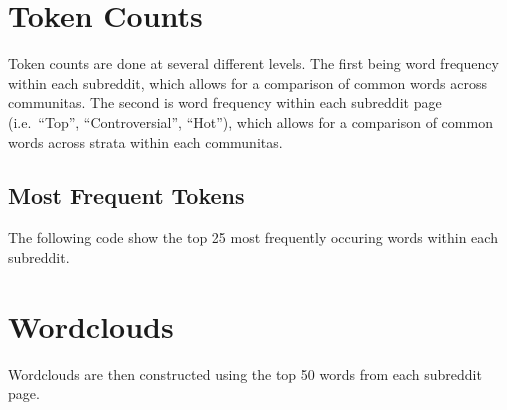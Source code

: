\documentclass[
]{book}
\newenvironment{Shaded}{\begin{snugshade}}{\end{snugshade}}
\newcommand{\CommentTok}[1]{\textcolor[rgb]{0.56,0.35,0.01}{\textit{#1}}}
\newcommand{\DataTypeTok}[1]{\textcolor[rgb]{0.13,0.29,0.53}{#1}}
\newcommand{\DecValTok}[1]{\textcolor[rgb]{0.00,0.00,0.81}{#1}}
\newcommand{\KeywordTok}[1]{\textcolor[rgb]{0.13,0.29,0.53}{\textbf{#1}}}
\newcommand{\NormalTok}[1]{#1}
\newcommand{\OperatorTok}[1]{\textcolor[rgb]{0.81,0.36,0.00}{\textbf{#1}}}
\newcommand{\OtherTok}[1]{\textcolor[rgb]{0.56,0.35,0.01}{#1}}
\newcommand{\StringTok}[1]{\textcolor[rgb]{0.31,0.60,0.02}{#1}}
\begin{document}
\hypertarget{token-counts}{%
\section{Token Counts}\label{token-counts}}

Token counts are done at several different levels. The first being word frequency within each subreddit, which allows for a comparison of common words across communitas. The second is word frequency within each subreddit page (i.e.~``Top'', ``Controversial'', ``Hot''), which allows for a comparison of common words across strata within each communitas.

\begin{Shaded}
\end{Shaded}

\hypertarget{most-frequent-tokens}{%
\subsection{Most Frequent Tokens}\label{most-frequent-tokens}}

The following code show the top 25 most frequently occuring words within each subreddit.

\begin{Shaded}
\end{Shaded}

\hypertarget{wordclouds}{%
\section{Wordclouds}\label{wordclouds}}

Wordclouds are then constructed using the top 50 words from each subreddit page.
\end{document}
